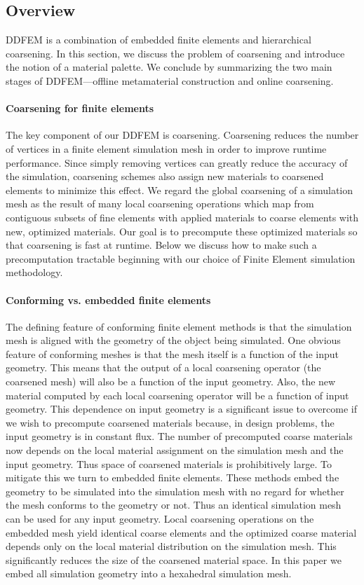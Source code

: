 \subsection{Overview}
DDFEM is a combination of embedded finite elements and hierarchical
coarsening.
In this section, we discuss the problem of coarsening
and introduce the notion of a material palette. We conclude by
summarizing the two main stages of DDFEM—offline metamaterial
construction and online coarsening.
\paragraph{Coarsening for finite elements}
The key component of our DDFEM is coarsening.
Coarsening reduces the number of vertices in a finite element simulation mesh in order to improve
runtime performance.
Since simply removing vertices can greatly reduce
the accuracy of the simulation, coarsening schemes also assign
new materials to coarsened elements to minimize this effect.
We regard the global coarsening of a simulation mesh as the result
of many local coarsening operations which map from contiguous
subsets of fine elements with applied materials to coarse elements
with new, optimized materials. Our goal is to precompute these
optimized materials so that coarsening is fast at runtime. Below we
discuss how to make such a precomputation tractable beginning with
our choice of Finite Element simulation methodology.
\paragraph{Conforming vs. embedded finite elements}
The defining feature of conforming finite element methods is that the simulation
mesh is aligned with the geometry of the object being simulated.
One obvious feature of conforming meshes is that the mesh itself is a
function of the input geometry.
This means that the output of a local coarsening operator (the coarsened mesh) will also be a function
of the input geometry.
Also, the new material computed by each local coarsening operator will be a function of input geometry.
This dependence on input geometry is a significant issue to overcome
if we wish to precompute coarsened materials because, in design
problems, the input geometry is in constant flux.
The number of precomputed coarse materials now depends on the local material
assignment on the simulation mesh and the input geometry.
Thus space of coarsened materials is prohibitively large.
To mitigate this we turn to embedded finite elements.
These methods embed the geometry to be simulated into the simulation mesh with no regard
for whether the mesh conforms to the geometry or not.
Thus an identical simulation mesh can be used for any input geometry.
Local coarsening operations on the embedded mesh yield identical coarse
elements and the optimized coarse material depends only on the
local material distribution on the simulation mesh. This significantly
reduces the size of the coarsened material space. In this paper we
embed all simulation geometry into a hexahedral simulation mesh.
